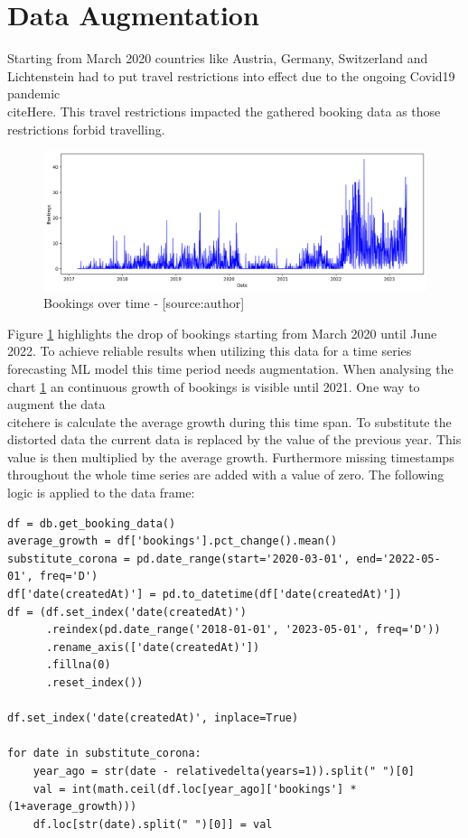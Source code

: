 \section{Data Augmentation}
\label{sec:data_aug}
Starting from March 2020 countries like Austria, Germany, Switzerland and Lichtenstein had to put travel restrictions into effect due to the ongoing Covid19 pandemic \\citeHere. This travel restrictions impacted the gathered booking data as those restrictions forbid travelling.
\begin{figure}[H]
	\centering
		\includegraphics[width=14cm]{images/no_augmentation}
	\caption{Bookings over time - [source:author]}
	\label{fig:noAug}
\end{figure}
Figure \ref{fig:noAug} highlights the drop of bookings starting from March 2020 until June 2022. To achieve reliable results when utilizing this data for a time series forecasting ML model this time period needs augmentation. When analysing the chart \ref{fig:noAug} an continuous growth of bookings is visible until 2021. One way to augment the data \\citehere is calculate the average growth during this time span. To substitute the distorted data the current data is replaced by the value of the previous year. This value is then multiplied by the average growth. Furthermore missing timestamps throughout the whole time series are added with a value of zero. The following logic is applied to the data frame: 

\begin{lstlisting}
df = db.get_booking_data()
average_growth = df['bookings'].pct_change().mean()
substitute_corona = pd.date_range(start='2020-03-01', end='2022-05-01', freq='D')
df['date(createdAt)'] = pd.to_datetime(df['date(createdAt)'])
df = (df.set_index('date(createdAt)')
      .reindex(pd.date_range('2018-01-01', '2023-05-01', freq='D'))
      .rename_axis(['date(createdAt)'])
      .fillna(0)
      .reset_index())

df.set_index('date(createdAt)', inplace=True)

for date in substitute_corona:
    year_ago = str(date - relativedelta(years=1)).split(" ")[0]
    val = int(math.ceil(df.loc[year_ago]['bookings'] * (1+average_growth)))
    df.loc[str(date).split(" ")[0]] = val
\end{lstlisting}

